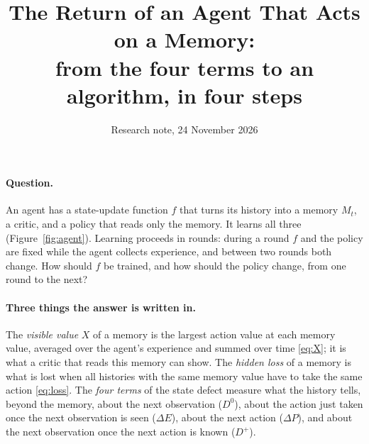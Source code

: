 \documentclass[11pt]{article}
\title{The Return of an Agent That Acts on a Memory:\\ from the four terms to an algorithm, in four steps}
\author{}
\date{Research note, 24 November 2026}
\theoremstyle{definition}
\newcommand{\dE}{\Delta E}
\newcommand{\dP}{\Delta P}
\begin{document}
\maketitle

\paragraph{Question.} An agent has a state-update function $f$ that turns its history into a memory $M_t$, a critic, and a policy that reads only the memory. It learns all three (Figure~\ref{fig:agent}). Learning proceeds in rounds: during a round $f$ and the policy are fixed while the agent collects experience, and between two rounds both change. How should $f$ be trained, and how should the policy change, from one round to the next?

\paragraph{Three things the answer is written in.} The \emph{visible value} $X$ of a memory is the largest action value at each memory value, averaged over the agent's experience and summed over time \eqref{eq:X}; it is what a critic that reads this memory can show. The \emph{hidden loss} of a memory is what is lost when all histories with the same memory value have to take the same action \eqref{eq:loss}. The \emph{four terms} of the state defect measure what the history tells, beyond the memory, about the next observation ($D^0$), about the action just taken once the next observation is seen ($\dE$), about the next action ($\dP$), and about the next observation once the next action is known ($D^+$).
\end{document}
